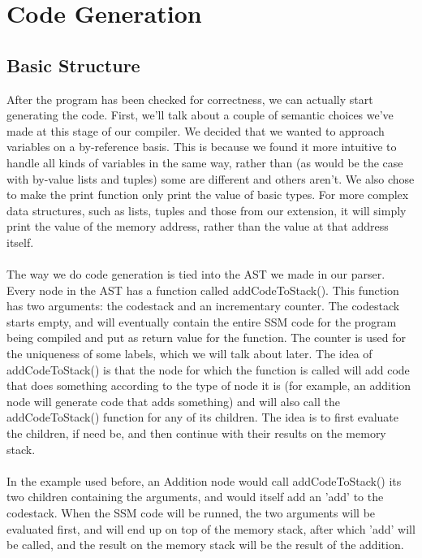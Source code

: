 \documentclass[10pt,a4paper]{article}
\begin{document}


\section{Code Generation}
\subsection{Basic Structure} 
After the program has been checked for correctness, we can actually start generating the code. First, we'll talk about a couple of semantic choices we've made at this stage of our compiler. We decided that we wanted to approach variables on a by-reference basis. This is because we found it more intuitive to handle all kinds of variables in the same way, rather than (as would be the case with by-value lists and tuples) some are different and others aren't. We also chose to make the print function only print the value of basic types. For more complex data structures, such as lists, tuples and those from our extension, it will simply print the value of the memory address, rather than the value at that address itself.\\
\\
The way we do code generation is tied into the AST we made in our parser. Every node in the AST has a function called addCodeToStack(). This function has two arguments: the codestack and an incrementary counter. The codestack starts empty, and will eventually contain the entire SSM code for the program being compiled and put as return value for the function. The counter is used for the uniqueness of some labels, which we will talk about later. The idea of addCodeToStack() is that the node for which the function is called will add code that does something according to the type of node it is (for example, an addition node will generate code that adds something) and will also call the addCodeToStack() function for any of its children. The idea is to first evaluate the children, if need be, and then continue with their results on the memory stack. \\
\\
In the example used before, an Addition node would call addCodeToStack() its two children containing the arguments, and would itself add an 'add' to the codestack. When the SSM code will be runned, the two arguments will be evaluated first, and will end up on top of the memory stack, after which 'add' will be called, and the result on the memory stack will be the result of the addition.
\end{document}
